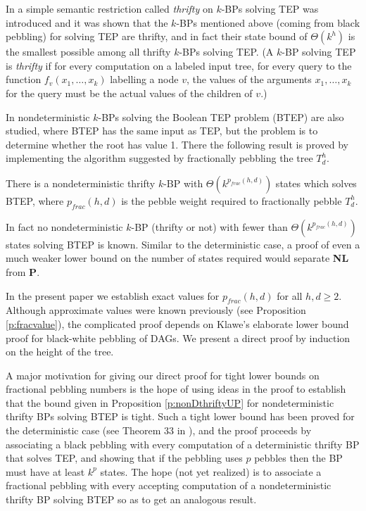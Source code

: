 \documentclass[oribib1]{llncs}
\begin{document}
In \cite{c:pebjournal} a simple semantic restriction called {\em thrifty}
on $k$-BPs solving TEP was introduced and it was shown that the
$k$-BPs mentioned above (coming from black pebbling) for solving TEP
are thrifty, and in fact their state bound of $\Theta(k^h)$ is the
smallest possible among all thrifty $k$-BPs solving TEP.
(A $k$-BP solving TEP is {\em thrifty} if for every computation
on a labeled input tree, for every query to the function
$f_v(x_1,\ldots,x_k)$ labelling a node $v$, the values of the
arguments $x_1,\ldots,x_k$ for the query must be the actual values of
the children of $v$.)

In \cite{c:pebjournal} nondeterministic $k$-BPs solving the Boolean
TEP problem (BTEP) are also studied, where BTEP has the same input
as TEP, but the problem is
to determine whether the root has value 1.  There the following
result is proved by implementing the algorithm suggested by fractionally 
pebbling the tree $T^h_d$.
\begin{proposition}\label{p:nonDthriftyUP}
There is a nondeterministic thrifty $k$-BP with
$\Theta(k^{p_{frac}(h,d)})$ states which solves BTEP, where $p_{frac}(h,d)$ is
the pebble weight required to fractionally pebble $T^h_d$.
\end{proposition}
In fact no nondeterministic $k$-BP (thrifty or not)
with fewer than $\Theta(k^{p_{frac}(h,d)})$ states solving BTEP is known. 
Similar to the deterministic case, a proof of even a much
weaker lower bound on the number of states required would separate
{\bf NL} from {\bf P}.

In the present paper we establish exact values for $p_{frac}(h,d)$ for
all $h,d \ge 2$.  Although approximate values were known previously
(see Proposition \ref{p:fracvalue}), the complicated proof depends on
Klawe's \cite{k:bwpyr} elaborate lower bound proof for black-white pebbling
of DAGs.  We present a direct proof by induction on the height of the tree.

A major motivation for giving our direct proof for tight lower bounds on
fractional pebbling numbers is the hope of using ideas in the proof to
establish that the bound given in Proposition \ref{p:nonDthriftyUP}
for nondeterministic thrifty BPs solving BTEP is tight.  Such a tight
lower bound has been proved for the deterministic case
(see Theorem 33 in \cite{c:pebjournal}), and the proof proceeds by associating
a black pebbling with every computation of a deterministic thrifty BP
that solves TEP, and showing that if the pebbling uses $p$ pebbles then
the BP must have at least $k^p$ states.   The hope (not yet realized)
is to associate a fractional pebbling with every accepting
computation of a nondeterministic thrifty BP solving BTEP so as to get an
analogous result. 
\end{document}
